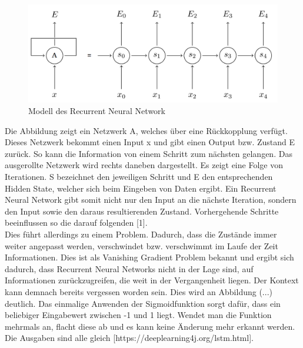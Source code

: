 \begin{figure}[h!]
	\centering
	\includegraphics[width=0.8\linewidth]{images/rnn}
	\caption{Modell des Recurrent Neural Network  \cite{GonzalezDominguez.2015}} %
	\label{fig:topology}
\end{figure}

Die Abbildung zeigt ein Netzwerk A, welches über eine Rückkopplung verfügt. Dieses Netzwerk bekommt einen Input x und gibt einen Output bzw. Zustand E zurück. So kann die Information von einem Schritt zum nächsten gelangen. Das ausgerollte Netzwerk wird rechts daneben dargestellt. Es zeigt eine Folge von Iterationen. S bezeichnet den jeweiligen Schritt und E den entsprechenden Hidden State, welcher sich beim Eingeben von Daten ergibt. Ein Recurrent Neural Network gibt somit nicht nur den Input an die nächste Iteration, sondern den Input sowie den daraus resultierenden Zustand. Vorhergehende Schritte beeinflussen so die darauf folgenden [1]. 
\\
Dies führt allerdings zu einem Problem. Dadurch, dass die Zustände immer weiter angepasst werden, verschwindet bzw. verschwimmt im Laufe der Zeit Informationen. Dies ist als Vanishing Gradient Problem bekannt und ergibt sich dadurch, dass Recurrent Neural Networks nicht in der Lage sind, auf Informationen zurückzugreifen, die weit in der Vergangenheit liegen. Der Kontext kann demnach bereits vergessen worden sein. Dies wird an Abbildung (...) deutlich. Das einmalige Anwenden der Sigmoidfunktion sorgt dafür, dass ein beliebiger Eingabewert zwischen -1 und 1 liegt. Wendet man die Funktion mehrmals an, flacht diese ab und es kann keine Änderung mehr erkannt werden. Die Ausgaben sind alle gleich [https://deeplearning4j.org/lstm.html].

